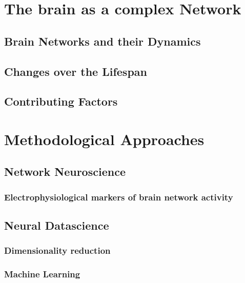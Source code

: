 \section{The brain as a complex Network}
	\subsection{Brain Networks and their Dynamics}
	\subsection{Changes over the Lifespan}
	\subsection{Contributing Factors}
\section{Methodological Approaches}
	\subsection{Network Neuroscience}
		\subsubsection{Electrophysiological markers of brain network activity}
	\subsection{Neural Datascience}
		\subsubsection{Dimensionality reduction}
		\subsubsection{Machine Learning}
